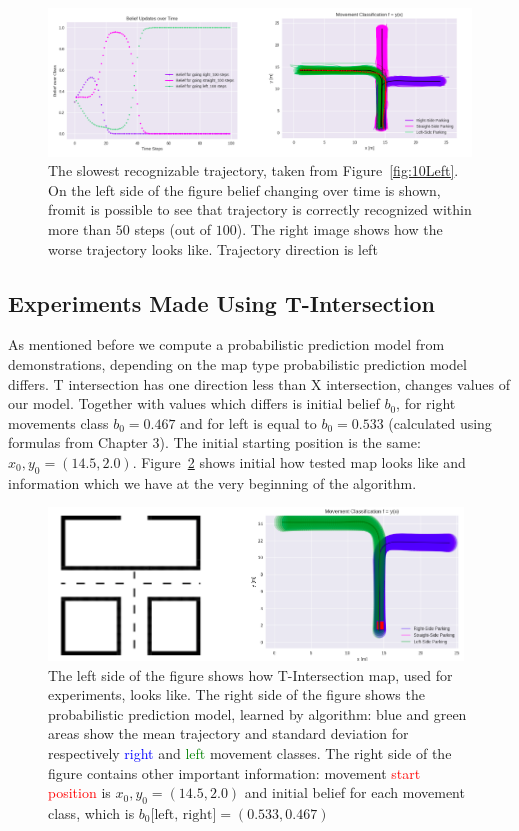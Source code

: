 \begin{figure}[H]
	\centering  	
	\includegraphics[width=12cm]{img/badleft.png}
	\caption{The slowest recognizable trajectory, taken from Figure~\ref{fig:10Left}. On the left side of the figure belief changing over time is shown, fromit is possible to see that trajectory is correctly recognized within more than $50$ steps (out of $100$). The right image shows how the worse trajectory looks like. Trajectory direction is left}
	\label{fig:LeftBad}    
\end{figure}

\subsection{Experiments Made Using T-Intersection}

As mentioned before we compute a probabilistic prediction model from demonstrations, depending on the map type probabilistic prediction model differs. T intersection has one direction less than X intersection, changes values of our model. Together with values which differs is initial belief $b_{0}$, for right movements class $b_{0} = 0.467$ and for left is equal to $b_{0} = 0.533$ (calculated using formulas from Chapter 3). The initial starting position is the same: $x_0,y_0 = (14.5, 2.0)$. Figure~\ref{fig:Tint} shows initial how tested map looks like and information which we have at the very beginning of the algorithm. 

\begin{figure}[H]
	\centering  	
	\includegraphics[width=11cm]{img/Tint.png}
	\caption{The left side of the figure shows how T-Intersection map, used for experiments, looks like. The right side of the figure shows the probabilistic prediction model, learned by algorithm:  blue and green areas show the mean trajectory and standard deviation for respectively \textcolor{blue}{right} and \textcolor{green}{left} movement classes. The right side of the figure contains other important information: movement \textcolor{red}{start position}  is $x_0,y_0 = (14.5, 2.0)$ and initial belief for each movement class, which is $b_0 \text{[left, right]}= (0.533, 0.467)$}
	\label{fig:Tint}    
\end{figure}

